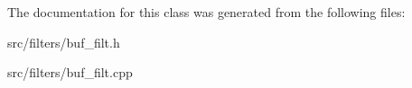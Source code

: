 The documentation for this class was generated from the following files\-:\begin{DoxyCompactItemize}
\item 
src/filters/buf\-\_\-filt.\-h\item 
src/filters/buf\-\_\-filt.\-cpp\end{DoxyCompactItemize}
